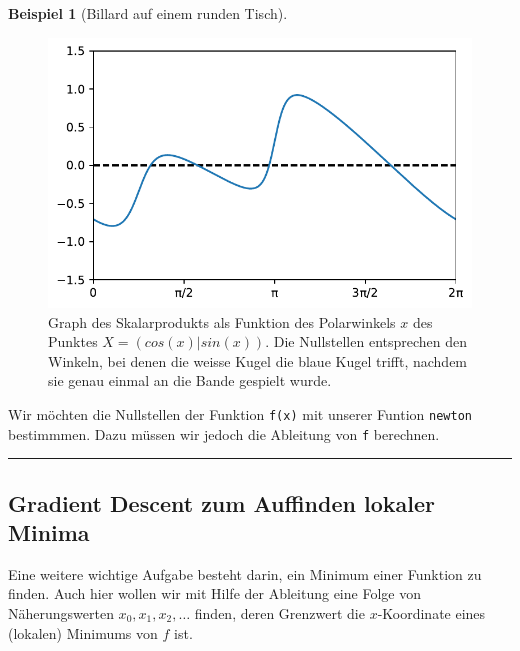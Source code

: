 \documentclass[
  a4paper,
  DIV=11]{scrreprt}
\theoremstyle{definition}
\theoremstyle{definition}
\newtheorem{example}{Beispiel}[chapter]
\theoremstyle{remark}
\begin{document}
\begin{example}[Billard auf einem runden
Tisch]
\begin{figure}[H]

{\centering \includegraphics{intro_files/figure-pdf/fig-graphofbillard-output-1.pdf}

}

\caption{\label{fig-graphofbillard}Graph des Skalarprodukts als Funktion
des Polarwinkels \(x\) des Punktes \(X = (cos(x) | sin(x))\). Die
Nullstellen entsprechen den Winkeln, bei denen die weisse Kugel die
blaue Kugel trifft, nachdem sie genau einmal an die Bande gespielt
wurde.}

\end{figure}

Wir möchten die Nullstellen der Funktion \texttt{f(x)} mit unserer
Funtion \texttt{newton} bestimmmen. Dazu müssen wir jedoch die Ableitung
von \texttt{f} berechnen.

\end{example}

\begin{center}\rule{0.5\linewidth}{0.5pt}\end{center}

\hypertarget{sec-gradientDescent}{%
\subsection{Gradient Descent zum Auffinden lokaler
Minima}\label{sec-gradientDescent}}

Eine weitere wichtige Aufgabe besteht darin, ein Minimum einer Funktion
zu finden. Auch hier wollen wir mit Hilfe der Ableitung eine Folge von
Näherungswerten \(x_0, x_1, x_2, \ldots\) finden, deren Grenzwert die
\(x\)-Koordinate eines (lokalen) Minimums von \(f\) ist.
\end{document}
